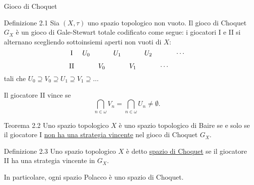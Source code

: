 \documentclass[babel]{beamer}
\renewcommand{\href}[2]{#2}
\begin{document}
\begin{frame}[label={sec:org1e115ec}]{Gioco di Choquet}
\begin{block}{Definizione 2.1}
Sia \((X,\tau)\) uno \href{../../../../../../../org/roam/20250103145124-topologia.org}{spazio topologico} non vuoto. Il gioco di Choquet \(G_{X}\) è un \href{../../../../../../../org/roam/20250513155732-logic_game.org}{gioco} \href{../../../../../../../org/roam/20250513171520-giochi_di_gale_stewart.org}{di Gale-Stewart} totale codificato come segue: i giocatori I e II si alternano scegliendo sottoinsiemi aperti non vuoti di \(X\):
\begin{equation*}
\begin{tikzcd}[ampersand replacement=\&,cramped,sep=tiny]
	{\text{I}} \& {U_0} \&\& {U_1} \&\& {U_2} \&\& \cdots \\
	{\text{II}} \&\& {V_0} \&\& {V_1} \&\& \cdots
\end{tikzcd}
\end{equation*}
tali che \(U_{0} \supseteq V_{0}\supseteq U_{1}\supseteq V_{1}\supseteq \dots\)

Il giocatore II vince se
\begin{equation*}
\bigcap_{n \in \omega} V_{n} = \bigcap_{n \in \omega} U_{n} \neq \emptyset.
\end{equation*}
\end{block}
\end{frame}
\begin{frame}[label={sec:org9d69a79}]
\begin{alertblock}{Teorema 2.2}
Uno \href{../../../../../../../org/roam/20250103145124-topologia.org}{spazio topologico} \(X\) è uno \href{../../../../../../../org/roam/20250514154101-spazio_topologico_di_baire.org}{spazio topologico di Baire} se e solo se il giocatore I \uline{non ha una \href{../../../../../../../org/roam/20250513171520-giochi_di_gale_stewart.org}{strategia} \href{../../../../../../../org/roam/20250513171520-giochi_di_gale_stewart.org}{vincente}} nel \href{../../../../../../../org/roam/20250514174255-gioco_di_choquet.org}{gioco di Choquet} \(G_{X}\).
\end{alertblock}
\begin{block}{Definizione 2.3}
Uno spazio topologico \(X\) è detto \uline{spazio di Choquet} se il giocatore II ha una strategia vincente in \(G_{X}\).
\end{block}

In particolare, ogni spazio Polacco è uno spazio di Choquet.

\end{frame}
\end{document}
